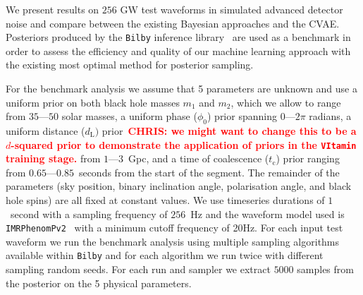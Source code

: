 \documentclass[%
showpacs,
 amsmath,amssymb,
 aps,
 twocolumn,
 prl,
 reprint,
floatfix,
]{revtex4-1}
\newcommand{\chris}[1]{\textbf{\textcolor{red}{CHRIS: #1}}}
\begin{document}
%
%
%
%
We present results on $256$ \ac{GW} test waveforms in simulated advanced detector noise and compare
between the existing Bayesian approaches and the \ac{CVAE}. Posteriors produced
by the \texttt{Bilby} inference library~\cite{1811.02042} are used as a
benchmark in order to assess the efficiency and quality of our machine learning
approach with the existing most optimal method for posterior sampling.

%
%
For the benchmark analysis we assume that 5 parameters are unknown and use a
uniform prior on both black hole masses $m_1$ and $m_2$, which we allow to
range from $35$---$50$ solar masses, a uniform phase ($\phi_0$) prior spanning
$0$---$2\pi$ radians, a uniform distance ($d_{\text{L}})$ prior~\chris{we might
want to change this to be a $d$-squared prior to demonstrate the application of
priors in the \texttt{VItamin} training stage.} from $1$---$3$~Gpc, and a time of
coalescence ($t_{\text{c}}$) prior ranging from
$0.65$---$0.85$~seconds from the
start of the segment. The remainder of the parameters (sky position, binary
inclination angle, polarisation angle, and black hole spins) are all fixed at
constant values. We use timeseries durations of $1$~second with a sampling
frequency of $256$~Hz and the waveform model used is
\texttt{IMRPhenomPv2}~\cite{1809.10113} with a minimum cutoff frequency of
20Hz. For each input test waveform we run the benchmark analysis using multiple
sampling algorithms available within \texttt{Bilby} and for each algorithm we
run twice with different sampling random seeds. For each run and sampler we
extract $5000$ samples from the posterior on the 5 physical parameters.  
\end{document}
